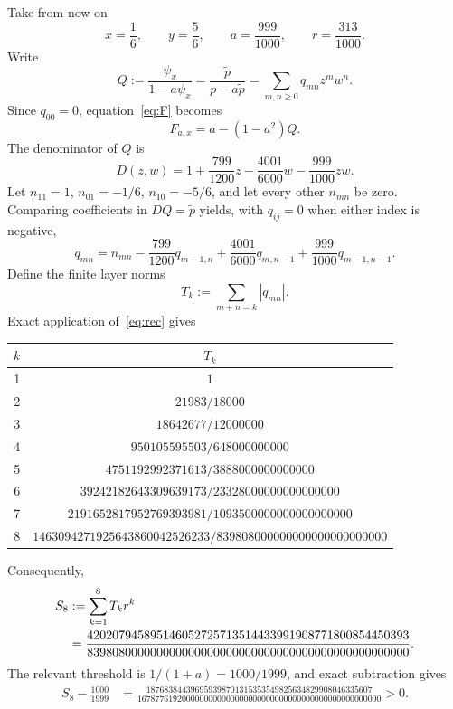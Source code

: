 \documentclass[11pt]{article}
\begin{document}
Take from now on
\[
 x=\frac16,\qquad y=\frac56,\qquad
 a=\frac{999}{1000},\qquad r=\frac{313}{1000}.
\]
Write
\[
 Q:=\frac{\psi_x}{1-a\psi_x}
   =\frac{\widetilde p}{p-a\widetilde p}
   =\sum_{m,n\geq0}q_{mn}z^mw^n.
\]
Since $q_{00}=0$, equation~\eqref{eq:F} becomes
\begin{equation}\label{eq:FQ}
 F_{a,x}=a-(1-a^2)Q.
\end{equation}
The denominator of $Q$ is
\begin{equation}\label{eq:D}
 D(z,w)=1+\frac{799}{1200}z-\frac{4001}{6000}w
              -\frac{999}{1000}zw.
\end{equation}
Let $n_{11}=1$, $n_{01}=-1/6$, $n_{10}=-5/6$, and let every other
$n_{mn}$ be zero.  Comparing coefficients in $DQ=\widetilde p$ yields,
with $q_{ij}=0$ when either index is negative,
\begin{equation}\label{eq:rec}
 q_{mn}=n_{mn}-\frac{799}{1200}q_{m-1,n}
                    +\frac{4001}{6000}q_{m,n-1}
                    +\frac{999}{1000}q_{m-1,n-1}.
\end{equation}
Define the finite layer norms
\[
 T_k:=\sum_{m+n=k}|q_{mn}|.
\]
Exact application of~\eqref{eq:rec} gives
\begin{center}
\small
\begin{tabular}{c|c}
$k$ & $T_k$\\ \hline
1 & $1$\\
2 & $21983/18000$\\
3 & $18642677/12000000$\\
4 & $950105595503/648000000000$\\
5 & $4751192992371613/3888000000000000$\\
6 & $39242182643309639173/23328000000000000000$\\
7 & $2191652817952769393981/1093500000000000000000$\\
8 & $1463094271925643860042526233/
       839808000000000000000000000$
\end{tabular}
\end{center}
Consequently,
\begin{align}
 S_8&:=\sum_{k=1}^{8}T_kr^k\notag\\
 &=\frac{420207945895146052725713514433991908771800854450393}
 {839808000000000000000000000000000000000000000000000}.
 \label{eq:S8}
\end{align}
The relevant threshold is $1/(1+a)=1000/1999$, and exact subtraction gives
\begin{align}
 S_8-\frac{1000}{1999}
 &=\frac{187683844396959398701315353549825634829908046335607}
 {1678776192000000000000000000000000000000000000000000000}
 >0. \label{eq:strict}
\end{align}
\end{document}
